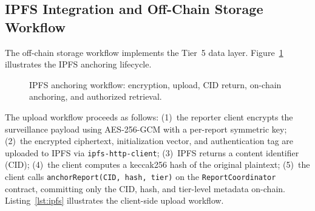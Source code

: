 \subsection{IPFS Integration and Off-Chain Storage Workflow}\label{subsec:ipfs_impl}

The off-chain storage workflow implements the Tier~5 data layer. Figure~\ref{fig:ipfs_workflow} illustrates the IPFS anchoring lifecycle.

\begin{figure}[!ht]
\centering
{}
\caption{IPFS anchoring workflow: encryption, upload, CID return, on-chain anchoring, and authorized retrieval.}\label{fig:ipfs_workflow}
\end{figure}

%
%

The upload workflow proceeds as follows: (1)~the reporter client encrypts the surveillance payload using AES-256-GCM with a per-report symmetric key; (2)~the encrypted ciphertext, initialization vector, and authentication tag are uploaded to IPFS via \texttt{ipfs-http-client}; (3)~IPFS returns a content identifier (CID); (4)~the client computes a keccak256 hash of the original plaintext; (5)~the client calls \texttt{anchorReport(CID, hash, tier)} on the \texttt{ReportCoordinator} contract, committing only the CID, hash, and tier-level metadata on-chain. Listing~\ref{lst:ipfs} illustrates the client-side upload workflow.

